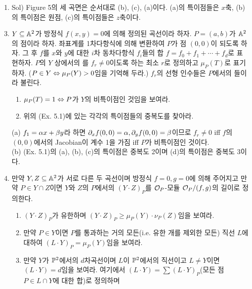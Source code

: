 	\begin{enumerate}[label=,itemindent=0mm]
	\item Sol) Figure 5의 세 곡면은 순서대로 (b), (c), (a)이다. (a)의 특이점들은 $x$축, (b)의 특이점은 원점,
	(c)의 특이점들은 $z$축이다.\\
	\end{enumerate}
	\begin{enumerate}[label=\tb{5.\arabic*.},itemindent=0mm,itemsep=4mm]
	\setcounter{enumi}{2}
	\item {} $Y\subseteq\mathbb{A}^2$가 방정식 $f(x,y)=0$에 의해 정의된 곡선이라 하자. $P=(a,b)$가 $\mathbb{A}^2$의 점이라 하자.
	좌표계를 1차다항식에 의해 변환하여 $P$가 점 $(0,0)$이 되도록 하자.
	그 후 $f$를 $x$와 $y$에 대한 $i$차 동차다항식 $f_i$들의 합 $f=f_0+f_1+\cdots+f_d$로 표현하자.
	$P$의 $Y$ 상에서의 를 $f_r\ne 0$이도록 하는 최소 $r$로 정의하고 $\mu_P(T)$로 표기하자.
	($P\in Y\Leftrightarrow\mu_P(Y)>0$임을 기억해 두라.) $f_r$의 선형 인수들은 $P$에서의 들이라 불린다.
	\begin{enumerate}[label=(\alph*)]
	\item $\mu_P(T)=1\Leftrightarrow P$가 $Y$의 비특이점인 것임을 보여라.
	\item 위의 (Ex. 5.1)에 있는 각각의 특이점들의 중복도를 찾아라.
	\end{enumerate}
	\sol (a) $f_1=\alpha x+\beta y$라 하면 $\partial_xf(0,0)=\alpha,\partial_yf(0,0)=\beta$이므로
	$f_r\ne 0$ iff $f$의 $(0,0)$에서의 Jacobian이 계수 1을 가짐 iff $P$가 비특이점인 것이다.\\
	(b) (Ex. 5.1)의 (a), (b), (c)의 특이점은 중복도 2이며 (d)의 특이점은 중복도 3이다.
	\item {} 만약 $Y,Z\subseteq\mathbb{A}^2$가 서로 다른 두 곡선이며 방정식 $f=0,g=0$에 의해 주어지고 만약 $P\in Y\cap Z$이면
		$Y$와 $Z$의 $P$에서의  $(Y\cdot Z)_P$를
		$\mathcal{O}_P$-모듈 $\mathcal{O}_P/(f,g)$의 길이로 정의한다.
		\begin{enumerate}[label=(\alph*)]
			\item $(Y\cdot Z)_P$가 유한하며 $(Y\cdot Z)_P\ge\mu_P(Y)\cdot\nu_P(Z)$임을 보여라.
			\item 만약 $P\in Y$이면 $P$를 통과하는 거의 모든(i.e. 유한 개를 제외한 모든) 직선 $L$에 대하여 $(L\cdot Y)_P=\mu_P(Y)$임을 보여라.
			\item 만약 $Y$가 $\mathbb{P}^2$에서의 $d$차곡선이며 $L$이 $\mathbb{P}^2$에서의 직선이고 $L\ne Y$이면 $(L\cdot Y)=d$임을 보여라.
			여기에서 $(L\cdot Y)=\sum(L\cdot Y)_P$(모든 점 $P\in L\cap Y$에 대한 합)로 정의하며

\end{enumerate}
\end{enumerate}
